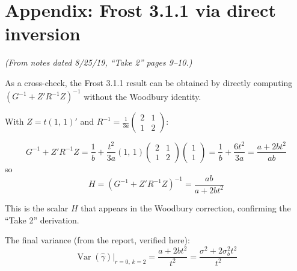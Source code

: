 \documentclass[11pt]{article}
\DeclareMathOperator{\Var}{Var}
\begin{document}
\section{Appendix: Frost 3.1.1 via direct inversion}
\label{sec:direct}

\noindent
\textit{(From notes dated 8/25/19, ``Take 2'' pages 9--10.)}

\medskip
\noindent
As a cross-check, the Frost 3.1.1 result can be obtained
by directly computing $(G^{-1} + Z'R^{-1}Z)^{-1}$ without
the Woodbury identity.

With $Z = t(1,\, 1)'$ and
$R^{-1} = \frac{1}{3a}\begin{pmatrix}2&1\\1&2\end{pmatrix}$:

\begin{equation}
  G^{-1} + Z'R^{-1}Z
  = \frac{1}{b} + \frac{t^2}{3a}(1,\,1)
    \begin{pmatrix}2&1\\1&2\end{pmatrix}
    \begin{pmatrix}1\\1\end{pmatrix}
  = \frac{1}{b} + \frac{6t^2}{3a}
  = \frac{a + 2bt^2}{ab}
\end{equation}
so
\begin{equation}
  H = (G^{-1} + Z'R^{-1}Z)^{-1} = \frac{ab}{a + 2bt^2}
\end{equation}

This is the scalar $H$ that appears in the Woodbury
correction, confirming the ``Take 2'' derivation.

The final variance (from the report, verified here):
\begin{equation}
  \Var(\hat\gamma)\big|_{r=0,\,k=2}
  = \frac{a + 2bt^2}{t^2}
  = \frac{\sigma^2 + 2\sigma_b^2 t^2}{t^2}
\end{equation}
\end{document}
